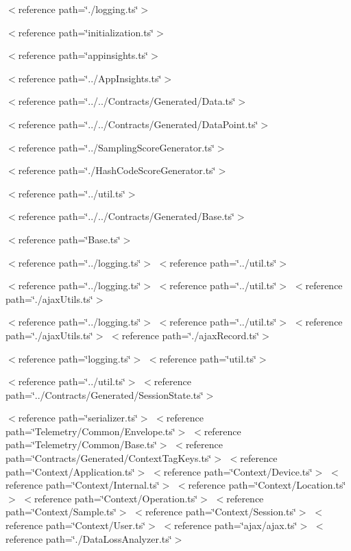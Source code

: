 $<$reference path=\char`\"{}./logging.\+ts\char`\"{}$>$ 

$<$reference path=\char`\"{}initialization.\+ts\char`\"{}$>$

$<$reference path=\char`\"{}appinsights.\+ts\char`\"{}$>$

$<$reference path=\char`\"{}../\+App\+Insights.\+ts\char`\"{}$>$

$<$reference path=\char`\"{}../../\+Contracts/\+Generated/\+Data.\+ts\char`\"{}$>$

$<$reference path=\char`\"{}../../\+Contracts/\+Generated/\+Data\+Point.\+ts\char`\"{}$>$

$<$reference path=\char`\"{}../\+Sampling\+Score\+Generator.\+ts\char`\"{}$>$

$<$reference path=\char`\"{}./\+Hash\+Code\+Score\+Generator.\+ts\char`\"{}$>$

$<$reference path=\char`\"{}../util.\+ts\char`\"{}$>$

$<$reference path=\char`\"{}../../\+Contracts/\+Generated/\+Base.\+ts\char`\"{}$>$

$<$reference path=\char`\"{}\+Base.\+ts\char`\"{}$>$

$<$reference path=\char`\"{}../logging.\+ts\char`\"{}$>$ $<$reference path=\char`\"{}../util.\+ts\char`\"{}$>$

$<$reference path=\char`\"{}../logging.\+ts\char`\"{}$>$ $<$reference path=\char`\"{}../util.\+ts\char`\"{}$>$ $<$reference path=\char`\"{}./ajax\+Utils.\+ts\char`\"{}$>$

$<$reference path=\char`\"{}../logging.\+ts\char`\"{}$>$ $<$reference path=\char`\"{}../util.\+ts\char`\"{}$>$ $<$reference path=\char`\"{}./ajax\+Utils.\+ts\char`\"{}$>$ $<$reference path=\char`\"{}./ajax\+Record.\+ts\char`\"{}$>$

$<$reference path=\char`\"{}logging.\+ts\char`\"{}$>$ $<$reference path=\char`\"{}util.\+ts\char`\"{}$>$

$<$reference path=\char`\"{}../util.\+ts\char`\"{}$>$ $<$reference path=\char`\"{}../\+Contracts/\+Generated/\+Session\+State.\+ts\char`\"{}$>$

$<$reference path=\char`\"{}serializer.\+ts\char`\"{}$>$ $<$reference path=\char`\"{}\+Telemetry/\+Common/\+Envelope.\+ts\char`\"{}$>$ $<$reference path=\char`\"{}\+Telemetry/\+Common/\+Base.\+ts\char`\"{}$>$ $<$reference path=\char`\"{}\+Contracts/\+Generated/\+Context\+Tag\+Keys.\+ts\char`\"{}$>$ $<$reference path=\char`\"{}\+Context/\+Application.\+ts\char`\"{}$>$ $<$reference path=\char`\"{}\+Context/\+Device.\+ts\char`\"{}$>$ $<$reference path=\char`\"{}\+Context/\+Internal.\+ts\char`\"{}$>$ $<$reference path=\char`\"{}\+Context/\+Location.\+ts\char`\"{}$>$ $<$reference path=\char`\"{}\+Context/\+Operation.\+ts\char`\"{}$>$ $<$reference path=\char`\"{}\+Context/\+Sample.\+ts\char`\"{}$>$ $<$reference path=\char`\"{}\+Context/\+Session.\+ts\char`\"{}$>$ $<$reference path=\char`\"{}\+Context/\+User.\+ts\char`\"{}$>$ $<$reference path=\char`\"{}ajax/ajax.\+ts\char`\"{}$>$ $<$reference path=\char`\"{}./\+Data\+Loss\+Analyzer.\+ts\char`\"{}$>$

